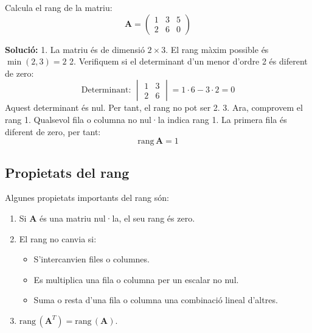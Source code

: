 \documentclass[12pt]{article}
\newcommand{\mat}[1]{\mathbf{#1}}
\begin{document}
\begin{exemple}
Calcula el rang de la matriu:
\[
\mat{A} = \begin{pmatrix}
1 & 3 & 5 \\
2 & 6 & 0
\end{pmatrix}
\]

\textbf{Solució:}
1. La matriu és de dimensió $2 \times 3$. El rang màxim possible és $\min(2, 3) = 2$
2. Verifiquem si el determinant d'un menor d'ordre 2 és diferent de zero:
\[
\text{Determinant: } \begin{vmatrix}
1 & 3 \\
2 & 6
\end{vmatrix} = 1\cdot6 - 3\cdot2 = 0
\]
Aquest determinant és nul. Per tant, el rang no pot ser 2.
3. Ara, comprovem el rang 1. Qualsevol fila o columna no nul·la indica rang 1. La primera fila és diferent de zero, per tant:
\[
\mathrm{rang}\,\mat{A} = 1
\]
\end{exemple}

\subsection{Propietats del rang}
\begin{concept}
Algunes propietats importants del rang són:
\begin{enumerate}
    \item Si $\mat{A}$ és una matriu nul·la, el seu rang és zero.
    \item El rang no canvia si:
        \begin{itemize}
            \item S’intercanvien files o columnes.
            \item Es multiplica una fila o columna per un escalar no nul.
            \item Suma o resta d’una fila o columna una combinació lineal d’altres.
        \end{itemize}
    \item $\mathrm{rang}\,(\mat{A}^T) = \mathrm{rang}\,(\mat{A})$.
\end{enumerate}
\end{concept}
\end{document}
